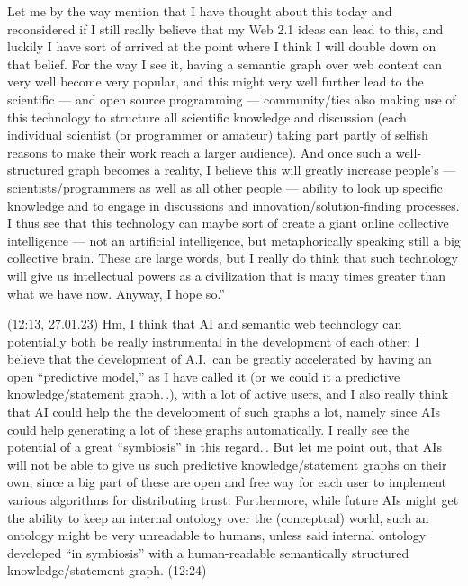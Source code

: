 \documentclass{report}
\begin{document}
Let me by the way mention that I have thought about this today and reconsidered if I still really believe that my Web 2.1 ideas can lead to this, and luckily I have sort of arrived at the point where I think I will double down on that belief. For the way I see it, having a semantic graph over web content can very well become very popular, and this might very well further lead to the scientific --- and open source programming --- community/ties also making use of this technology to structure all scientific knowledge and discussion (each individual scientist (or programmer or amateur) taking part partly of selfish reasons to make their work reach a larger audience). And once such a well-structured graph becomes a reality, I believe this will greatly increase people's --- scientists/programmers as well as all other people --- ability to look up specific knowledge and to engage in discussions and innovation/solution-finding processes. I thus see that this technology can maybe sort of create a giant online collective intelligence --- not an artificial intelligence, but metaphorically speaking still a big collective brain. These are large words, but I really do think that such technology will give us intellectual powers as a civilization that is many times greater than what we have now. Anyway, I hope so.''


(12:13, 27.01.23) Hm, I think that AI and semantic web technology can potentially both be really instrumental in the development of each other: I believe that the development of A.I.\ can be greatly accelerated by having an open ``predictive model,'' as I have called it (or we could it a predictive knowledge/statement graph.\,.), with a lot of active users, and I also really think that AI could help the the development of such graphs a lot, namely since AIs could help generating a lot of these graphs automatically. I really see the potential of a great ``symbiosis'' in this regard.\,. But let me point out, that AIs will not be able to give us such predictive knowledge/statement graphs on their own, since a big part of these are open and free way for each user to implement various algorithms for distributing trust. Furthermore, while future AIs might get the ability to keep an internal ontology over the (conceptual) world, such an ontology might be very unreadable to humans, unless said internal ontology developed ``in symbiosis'' with a human-readable semantically structured knowledge/statement graph. (12:24)
\end{document}

